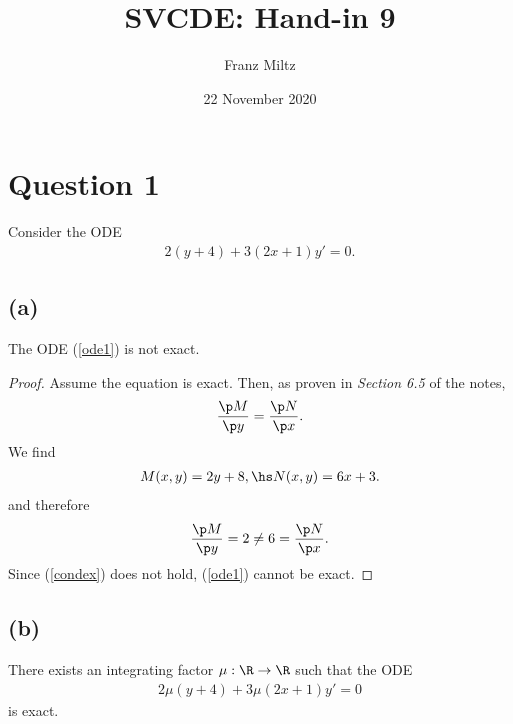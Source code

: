 \documentclass{article}
\begin{document}
\title{SVCDE: Hand-in 9}
\author{Franz Miltz}
\date{22 November 2020}
\maketitle


\section*{Question 1}


Consider the ODE
\begin{align}
    \label{ode1}
    2(y+4)+3(2x+1)y' = 0.
\end{align}


\subsection*{(a)}

\begin{claim*}
    The ODE (\ref{ode1}) is not exact.
\end{claim*}
\begin{proof}
    Assume the equation is exact. Then, as proven in \emph{Section 6.5} of the notes,
    \begin{align}
        \label{condex}
        \frac{\p M}{\p y} = \frac{\p N}{\p x}.
    \end{align}
    We find
    \begin{align*}
        M(x,y) = 2y+8,\hs N(x,y)=6x+3.
    \end{align*}
    and therefore
    \begin{align*}
        \frac{\p M}{\p y} = 2 \not= 6 = \frac{\p N}{\p x}.
    \end{align*}
    Since (\ref{condex}) does not hold, (\ref{ode1}) cannot be exact.
\end{proof}


\subsection*{(b)}


\begin{claim*}
    There exists an integrating factor $\mu:\R\to\R$ such that the ODE
    \begin{align}
        \label{ode2}
        2\mu(y+4)+3\mu(2x+1)y'=0
    \end{align}
    is exact.
\end{claim*}
\end{document}
